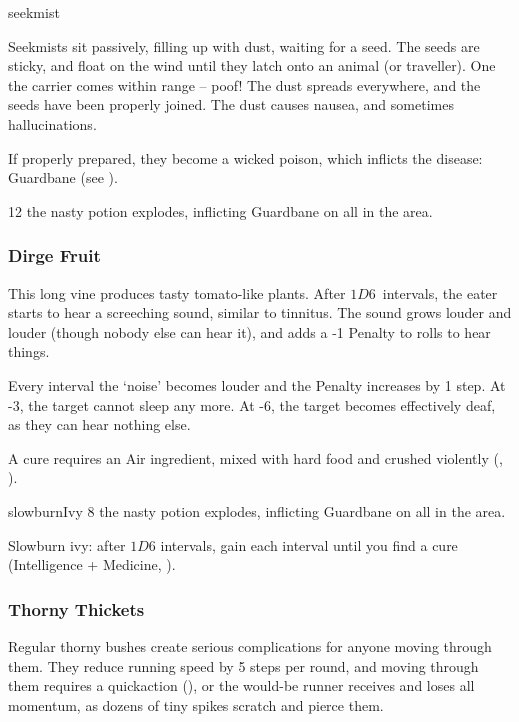 \begin{multicols}{2}
%
  {seekmist}%
  {
  Seekmists sit passively, filling up with dust, waiting for a seed.
  The seeds are sticky, and float on the wind until they latch onto an animal (or traveller).
  One the carrier comes within range -- poof!
  The dust spreads everywhere, and the seeds have been properly joined.
  The dust causes nausea, and sometimes hallucinations.

  If properly prepared, they become a wicked poison, which inflicts the disease: Guardbane (see ).
    }
  {}%
  {12}%
  {the nasty potion explodes, inflicting Guardbane on all in the \gls{area}.}%

\subsubsection{Dirge Fruit}
\label{dirgeFruit}

This long vine produces tasty tomato-like plants.
After $1D6$~\glspl{interval}, the eater starts to hear a screeching sound, similar to tinnitus.
The sound grows louder and louder (though nobody else can hear it), and adds a -1 Penalty to rolls to hear things.

Every \gls{interval} the `noise' becomes louder and the Penalty increases by 1 step.
At -3, the target cannot sleep any more.
At -6, the target becomes effectively deaf, as they can hear nothing else.

A cure requires an Air \gls{ingredient}, mixed with hard food and crushed violently (, \tn[10]).

%
  {slowburnIvy}%
  {
    }
  {}%
  {8}%
  {the nasty potion explodes, inflicting Guardbane on all in the \gls{area}.}%

Slowburn ivy: after $1D6$ \glspl{interval}, gain  each \gls{interval} until you find a cure (Intelligence + Medicine, \tn[8]). \\

\subsubsection{Thorny Thickets}
\label{thorny_thickets}

Regular thorny bushes create serious complications for anyone moving through them.
They reduce running speed by 5 \glspl{step} per round, and moving through them requires a  \gls{quickaction} (\tn[10]), or the would-be runner receives  and loses all momentum, as dozens of tiny spikes scratch and pierce them.


\end{multicols}
